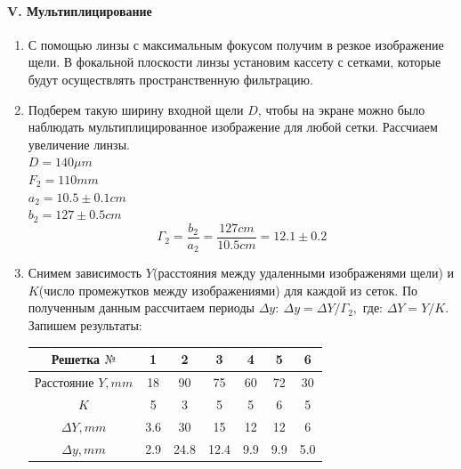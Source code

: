 \documentclass[12pt]{article}
\begin{document}
\paragraph{V. Мультиплицирование}
\begin{enumerate}
    \item С помощью линзы с максимальным фокусом получим в резкое изображение щели. В фокальной плоскости линзы установим кассету с сетками, которые будут осуществлять пространственную фильтрацию. 
    \item Подберем такую ширину входной щели $D$, чтобы на экране можно было наблюдать мультиплицированное изображение для любой сетки. Рассчиаем увеличение линзы. \\
    $ D = 140 \mu m $ \\
    $ F_2 =  110 mm $ \\
    $ a_2 = 10.5 \pm 0.1 cm $ \\
    $ b_2 = 127 \pm 0.5 cm $ \\
    \[ \Gamma_2 = \frac{b_2}{a_2} = \frac{127 cm}{10.5 cm} = 12.1 \pm 0.2 \]
    \item Снимем зависимость $Y$(расстояния между удаленными изображенями щели) и $K$(число промежутков между изображениями) для каждой из сеток. По полученным данным рассчитаем периоды $\Delta y :\ \Delta y = \Delta Y / \Gamma_2, \text{ где: } \Delta Y = Y/K$. Запишем результаты: \\
    \begin{tabu} to 1\textwidth{|c|c|c|c|c|c|c|}
    \hline
    Решетка $№$ & 1 & 2 & 3 & 4 & 5 & 6 \\
    \hline
    Расстояние $Y, mm$ & 18 & 90 & 75 & 60 & 72 & 30 \\
    \hline
    $K$ & 5 & 3 & 5 & 5 & 6 & 5 \\
    \hline
    $ \Delta Y, mm $ & 3.6 & 30 & 15 & 12 & 12 & 6 \\
    \hline
    $ \Delta y, mm $ & 2.9 & 24.8 & 12.4 & 9.9 & 9.9 & 5.0 \\
    \hline
    \end{tabu}
    

\end{enumerate}
\end{document}
